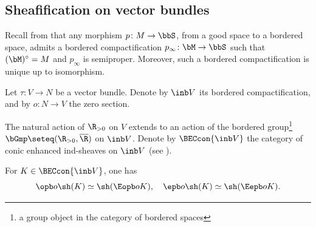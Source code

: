 \subsection{Sheafification on vector bundles}
Recall from \cite[\S2.2]{DK19nu} that any morphism $p\colon M\to\bbS$, from a good space to a bordered space, admits a bordered compactification $p_\infty\colon\bM\to\bbS$ such that $(\bM){}^\circ=M$ and $p_\infty$ is semiproper.
Moreover, such a bordered compactification is unique up to isomorphism.

Let $\tau\colon V\to N$ be a vector bundle.
Denote by $\inb V$ its bordered compactification, and by $o\colon N\to V$ the zero section.

The natural action of $\R_{>0}$ on $V$ extends to an action of the bordered group\footnote{a group object in the category of bordered spaces} $\bGmp \seteq (\R_{>0},\overline\R)$ on $\inb V$.
Denote by $\BECcon{\inb V}$ the category of conic enhanced ind-sheaves on $\inb V$ (see \cite[\S4.1]{DK19nu}).

\begin{lemma}\label{lem:oshsho}
For $K\in\BECcon{\inb V}$, one has
\[
\opb o \sh (K) \simeq \sh(\Eopb o K), \quad
\epb o \sh (K) \simeq \sh(\Eepb o K).
\]
\end{lemma}

